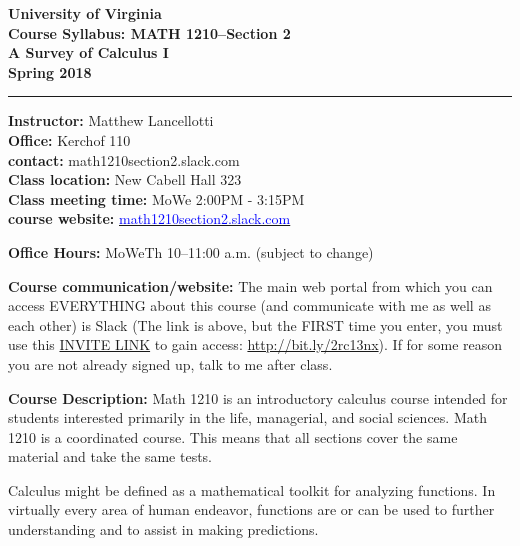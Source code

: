 \documentclass[11pt]{article}
\newcommand{\blue}[1]{\textcolor{blue}{#1}}
\newcommand{\vs}{\vspace{0.5cm}}
\begin{document}
\begin{center}
{\bf University of Virginia \\ Course Syllabus: MATH 1210--Section 2 \\ A Survey of Calculus I \\ Spring 2018}
\end{center}


\begin{flushleft}
\rule{\textwidth}{.01in}
\end{flushleft}

\begin{multicols}{2}
\noindent\textbf{Instructor:} Matthew Lancellotti \\
\noindent\textbf{Office:} Kerchof 110 \\
\noindent\textbf{contact:} math1210section2.slack.com \\
\noindent\textbf{Class location:} New Cabell Hall 323\\
\noindent\textbf{Class meeting time:} MoWe 2:00PM - 3:15PM \\
\noindent\textbf{course website:} \href{https://math1210section2.slack.com}{\blue{math1210section2.slack.com}}
\end{multicols}
\noindent\textbf{Office Hours:} MoWeTh 10--11:00 a.m. (subject to change)

\vs\vs
\noindent\textbf{Course communication/website:}
The main web portal from which you can access EVERYTHING about this course (and communicate with me as well as each other) is Slack (The link is above, but the FIRST time you enter, you must use this \href{https://join.slack.com/t/math-1210-section-2/shared_invite/enQtMjk5NjMxNzUzNjUyLWVhMzYxZGU5MzcyMGE1NWUyMzRmNWU4ODU1N2RkMTRkMjlhM2VmODEzYTMxYzgwMzExNzY5NGUxMDBjMTc1NzM}{INVITE LINK} to gain access: \url{http://bit.ly/2rc13nx}).  If for some reason you are not already signed up, talk to me after class.



\vs
\noindent\textbf{Course Description:}
Math 1210 is an introductory calculus course intended for students interested primarily in the life, managerial, and social sciences. Math 1210 is a coordinated course. This means that all sections cover the same material and take the same tests.

Calculus might be defined as a mathematical toolkit for analyzing functions. In virtually every area of human endeavor, functions are or can be used to further understanding and to assist in making predictions.
\end{document}
